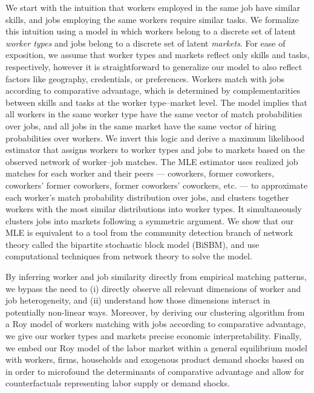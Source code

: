 \documentclass[12pt]{article}
\theoremstyle{definition}
\theoremstyle{plain}
\begin{document}
We start with the intuition that workers employed in the same job have similar skills, and jobs employing the same workers require similar tasks. We formalize this intuition using a \citet{Roy1951} model in which workers belong to a discrete set of latent \emph{worker types} and jobs belong to a discrete set of latent \emph{markets}. For ease of exposition, we assume that worker types and markets reflect only skills and tasks, respectively, however it is straightforward to generalize our model to also reflect factors like geography, credentials, or preferences.  Workers match with jobs according to comparative advantage, which is determined by complementarities between skills and tasks at the worker type--market level. The model implies that all workers in the same worker type have the same vector of match probabilities over jobs, and all jobs in the same market have the same vector of hiring probabilities over workers. We invert this logic and derive a maximum likelihood estimator that assigns workers to worker types and jobs to markets based on the observed network of worker--job matches. The MLE estimator uses realized job matches for each worker and their peers --- coworkers, former coworkers, coworkers' former coworkers, former coworkers' coworkers, etc. --- to approximate each worker's match probability distribution over jobs, and clusters together workers with the most similar distributions into worker types. It simultaneously clusters jobs into markets following a symmetric argument. We show that our MLE is equivalent to a tool from the community detection branch of network theory called the bipartite stochastic block model (BiSBM), and use computational techniques from network theory to solve the model. 


By inferring worker and job similarity directly from empirical matching patterns, we bypass the need to (i) directly observe all relevant dimensions of worker and job heterogeneity, and (ii) understand how those dimensions interact in potentially non-linear ways. Moreover, by deriving our clustering algorithm from a Roy model of workers matching with jobs according to comparative advantage, we give our worker types and markets precise economic interpretability. Finally, we embed our Roy model of the labor market within a general equilibrium model with workers, firms, households and exogenous product demand shocks based on \citet{Grigsby2022} in order to microfound the determinants of comparative advantage and allow for counterfactuals representing labor supply or demand shocks. 
\end{document}
